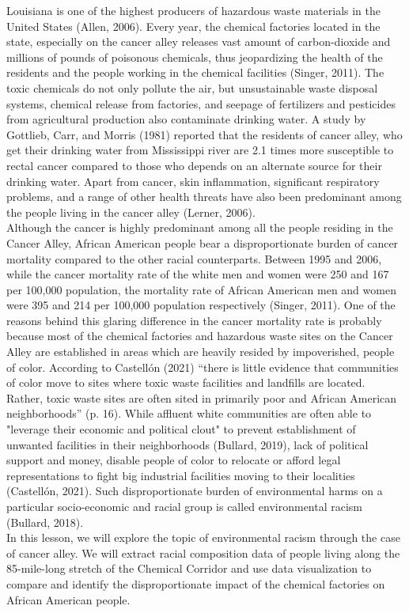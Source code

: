 \documentclass[a4paper, 11pt]{article}
\begin{document}
	Louisiana is one of the highest producers of hazardous waste materials in the United States (Allen, 2006). Every year, the chemical factories located in the state, especially on the cancer alley releases vast amount of carbon-dioxide and millions of pounds of poisonous chemicals, thus jeopardizing the health of the residents and the people working in the chemical facilities (Singer, 2011). The toxic chemicals do not only pollute the air, but unsustainable waste disposal systems, chemical release from factories, and seepage of fertilizers and pesticides from agricultural production also contaminate drinking water. A study by Gottlieb, Carr, and Morris (1981) reported that the residents of cancer alley, who get their drinking water from Mississippi river are 2.1 times more susceptible to rectal cancer compared to those who depends on an alternate source for their drinking water. Apart from cancer, skin inflammation, significant respiratory problems, and a range of other health threats have also been predominant among the people living in the cancer alley (Lerner, 2006).\\[1ex]
%	
	Although the cancer is highly predominant among all the people residing in the Cancer Alley, African American people bear a disproportionate burden of cancer mortality compared to the other racial counterparts. Between 1995 and 2006, while the cancer mortality rate of the white men and women were 250 and 167 per 100,000 population, the mortality rate of African American men and women were 395 and 214 per 100,000 population respectively (Singer, 2011). One of the reasons behind this glaring difference in the cancer mortality rate is probably because most of the chemical factories and hazardous waste sites on the Cancer Alley are established in areas which are heavily resided by impoverished, people of color. According to Castellón (2021) “there is little evidence that communities of color move to sites where toxic waste facilities and landfills are located. Rather, toxic waste sites are often sited in primarily poor and African American neighborhoods” (p. 16). While affluent white communities are often able to "leverage their economic and political clout" to prevent establishment of unwanted facilities in their neighborhoods (Bullard, 2019), lack of political support and money, disable people of color to relocate or afford legal representations to fight big industrial facilities moving to their localities (Castellón, 2021). Such disproportionate burden of environmental harms on a particular socio-economic and racial group is called environmental racism (Bullard, 2018).\\[1ex]
%	
	In this lesson, we will explore the topic of environmental racism through the case of cancer alley. We will extract racial composition data of people living along the 85-mile-long stretch of the Chemical Corridor and use data visualization to compare and identify the disproportionate impact of the chemical factories on African American people.
%
\end{document}
